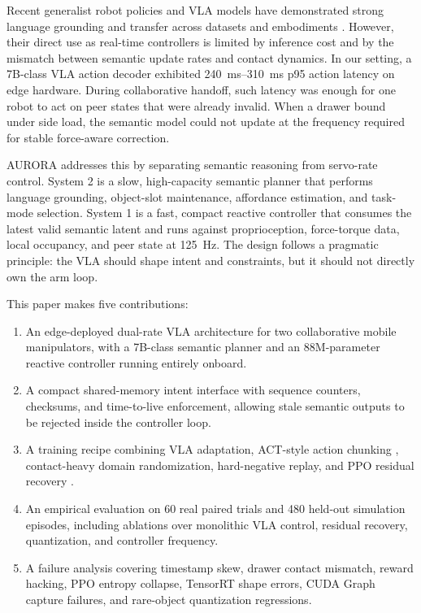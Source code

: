 \documentclass[10pt,twocolumn]{article}
\begin{document}
Recent generalist robot policies and VLA models have demonstrated strong language grounding and transfer across datasets and embodiments \citep{openx2023rtx,kim2024openvla,octo2024,droid2024}. However, their direct use as real-time controllers is limited by inference cost and by the mismatch between semantic update rates and contact dynamics. In our setting, a 7B-class VLA action decoder exhibited \SI{240}{ms}--\SI{310}{ms} p95 action latency on edge hardware. During collaborative handoff, such latency was enough for one robot to act on peer states that were already invalid. When a drawer bound under side load, the semantic model could not update at the frequency required for stable force-aware correction.

AURORA addresses this by separating semantic reasoning from servo-rate control. System 2 is a slow, high-capacity semantic planner that performs language grounding, object-slot maintenance, affordance estimation, and task-mode selection. System 1 is a fast, compact reactive controller that consumes the latest valid semantic latent and runs against proprioception, force-torque data, local occupancy, and peer state at \SI{125}{Hz}. The design follows a pragmatic principle: the VLA should shape intent and constraints, but it should not directly own the arm loop.

This paper makes five contributions:
\begin{enumerate}[leftmargin=1.3em,itemsep=0.15em]
  \item An edge-deployed dual-rate VLA architecture for two collaborative mobile manipulators, with a 7B-class semantic planner and an 88M-parameter reactive controller running entirely onboard.
  \item A compact shared-memory intent interface with sequence counters, checksums, and time-to-live enforcement, allowing stale semantic outputs to be rejected inside the controller loop.
  \item A training recipe combining VLA adaptation, ACT-style action chunking \citep{zhao2023act}, contact-heavy domain randomization, hard-negative replay, and PPO residual recovery \citep{schulman2017ppo}.
  \item An empirical evaluation on 60 real paired trials and 480 held-out simulation episodes, including ablations over monolithic VLA control, residual recovery, quantization, and controller frequency.
  \item A failure analysis covering timestamp skew, drawer contact mismatch, reward hacking, PPO entropy collapse, TensorRT shape errors, CUDA Graph capture failures, and rare-object quantization regressions.
\end{enumerate}
\end{document}
